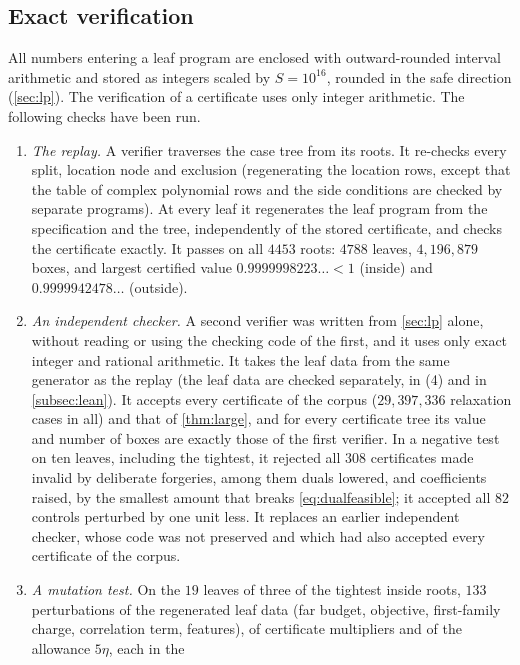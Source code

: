 \subsection{Exact verification}
All numbers entering a leaf program are enclosed with outward-rounded interval arithmetic and
stored as integers scaled by $S=10^{16}$, rounded in the safe direction (\cref{sec:lp}). The
verification of a certificate uses only integer arithmetic. The following checks have been run.
\begin{enumerate}[(1)]
  \item \emph{The replay.} A verifier traverses the case tree from its roots. It re-checks every
    split, location node and exclusion (regenerating the location rows, except that the table
    of complex polynomial rows and the side conditions \cite[(4.29), (4.34)]{Xylouris2011nullstellen} are
    checked by separate programs).
    At every leaf it regenerates the leaf program from the specification and the tree,
    independently of the stored certificate, and checks the certificate exactly. It passes on all
    $4453$ roots: $4788$ leaves, $4{,}196{,}879$ boxes, and largest certified value
    $0.9999998223\ldots<1$ (inside) and $0.9999942478\ldots$ (outside).
  \item \emph{An independent checker.} A second verifier was written from \cref{sec:lp} alone,
    without reading or using the checking code of the first, and it uses only exact integer and
    rational arithmetic. It takes the leaf data from the same generator as the replay (the leaf
    data are checked separately, in (4) and in \cref{subsec:lean}). It accepts every certificate of
    the corpus ($29{,}397{,}336$ relaxation cases in all) and that of \cref{thm:large}, and for every
    certificate tree its value and number of boxes are exactly those of the first verifier. In a
    negative test on ten leaves, including the tightest, it rejected all $308$ certificates made
    invalid by deliberate forgeries, among them duals lowered, and coefficients raised, by the
    smallest amount that breaks \eqref{eq:dualfeasible}; it accepted all $82$ controls perturbed by
    one unit less. It replaces an earlier independent checker, whose code was not preserved and
    which had also accepted every certificate of the corpus.
  \item \emph{A mutation test.} On the $19$ leaves of three of the tightest inside roots, $133$
    perturbations of the regenerated leaf data (far budget, objective, first-family charge,
    correlation term, features), of certificate multipliers and of the allowance $5\eta$, each in the

\end{enumerate}
